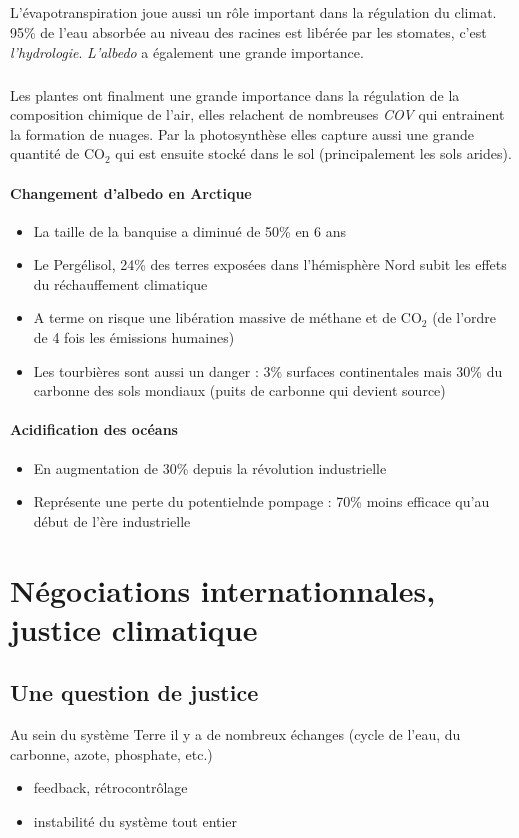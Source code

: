 \documentclass {article}
\newcommand{\V}[0]{\vspace{1\baselineskip}}
\begin{document}
\subparagraph{}
L'évapotranspiration joue aussi un rôle important dans la régulation du climat. 95\% de l'eau absorbée au niveau des racines est libérée par les stomates, c'est \emph{l'hydrologie}. \emph{L'albedo} a également une grande importance.

\subparagraph{}
Les plantes ont finalment une grande importance dans la régulation de la composition chimique de l'air, elles relachent de nombreuses \emph{COV} qui entrainent la formation de nuages. Par la photosynthèse elles capture aussi une grande quantité de CO$_2$ qui est ensuite stocké dans le sol (principalement les sols arides).

\paragraph{Changement d'albedo en Arctique}
\begin{itemize}
\item La taille de la banquise a diminué de 50\% en 6 ans
\item Le Pergélisol, 24\% des terres exposées dans l'hémisphère Nord subit les effets du réchauffement climatique
\item A terme on risque une libération massive de méthane et de CO$_2$ (de l'ordre de 4 fois les émissions humaines)
\item Les tourbières sont aussi un danger : 3\% surfaces continentales mais 30\% du carbonne des sols mondiaux (puits de carbonne qui devient source)
\end{itemize}

\paragraph{Acidification des océans}
\begin{itemize}
\item En augmentation de 30\% depuis la révolution industrielle
\item Représente une perte du potentielnde pompage : 70\% moins efficace qu'au début de l'ère industrielle
\end{itemize}

\section{Négociations internationnales, justice climatique}
\bigskip
\subsection{Une question de justice}
\bigskip
Au sein du système Terre il y a de nombreux échanges (cycle de l'eau, du carbonne, azote, phosphate, etc.)
\begin{itemize}
\item feedback, rétrocontrôlage
\item instabilité du système tout entier
\end{itemize}
\V
\end{document}
